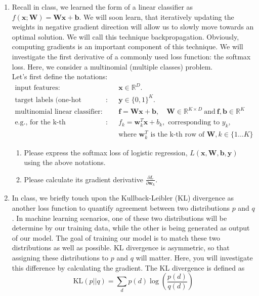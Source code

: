 \documentclass[a4paper]{article}
\begin{document}
\begin{enumerate}
\begin{enumerate}
\end{enumerate}


\item Recall in class, we learned the form of a linear classifier as $f(\bm{x}; \bm{W}) =  \bm{W}\bm{x}+\bm{b}$. We will soon learn, that iteratively updating the weights in negative gradient direction will allow us to slowly move towards an optimal solution. We will call this technique backpropagation. Obviously, computing gradients is an important component of this technique. We will investigate the first derivative of a commonly used loss function: the softmax loss. Here, we consider a multinomial (multiple classes) problem. \\
Let's first define the notations:
\begin{align*}
	\text{input features}: & \quad \bm{x} \in \mathbb{R}^D.\\
	\text{target labels (one-hot encoded)}: & \quad \bm{y} \in \{0,1\}^K.\\
	\text{multinomial linear classifier}: & \quad \bm{f} = \bm{W}\bm{x} + \bm{b}, \quad \bm{W} \in \mathbb{R}^{K \times D}\ \text{and}\ \bm{f}, \bm{b} \in \mathbb{R}^K\\
	\text{e.g., for the k-th classification}: & \quad f_k = \bm{w}_k^T \bm{x} + b_k, \text{ corresponding to } y_k,\\
								&\quad \text{where } \bm{w}^T_k \text{ is the k-th row of } \bm{W}, k \in \{1...K\}  
\end{align*}
\begin{enumerate}
	\item Please express the softmax loss of logistic regression, $L(\bm{x}, \bm{W}, \bm{b}, \bm{y})$ using the above notations.
	\item Please calculate its gradient derivative $\frac{\partial L}{\partial \bm{w}_k}$.
\end{enumerate}

\item In class, we briefly touch upon the Kullback-Leibler (KL) divergence as another loss function to quantify agreement between two distributions $p$ and $q$. In machine learning scenarios, one of these two distributions will be determine by our training data, while the other is being generated as output of our model. The goal of training our model is to match these two distributions as well as possible. KL divergence is asymmetric, so that assigning these distributions to $p$ and $q$ will matter. Here, you will investigate this difference by calculating the gradient. The KL divergence is defined as 
\begin{equation}
	\text{KL}(p||q) = \sum_d p(d) \log \left( \frac{p(d)}{q(d)} \right) \nonumber
\end{equation}


\end{enumerate}
\end{document}
